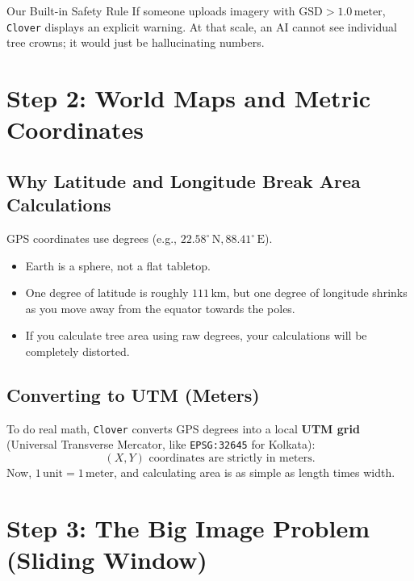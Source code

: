\documentclass[11pt,a4paper]{article}
\begin{document}
\begin{plainbox}{Our Built-in Safety Rule}
If someone uploads imagery with $\text{GSD} > 1.0\,\text{meter}$, \texttt{Clover} displays an explicit warning. At that scale, an AI cannot see individual tree crowns; it would just be hallucinating numbers.
\end{plainbox}

\section{Step 2: World Maps and Metric Coordinates}

\subsection{Why Latitude and Longitude Break Area Calculations}
GPS coordinates use degrees (e.g., $22.58^\circ\,\text{N}, 88.41^\circ\,\text{E}$). 
\begin{itemize}
    \item Earth is a sphere, not a flat tabletop. 
    \item One degree of latitude is roughly $111\,\text{km}$, but one degree of longitude shrinks as you move away from the equator towards the poles.
    \item If you calculate tree area using raw degrees, your calculations will be completely distorted.
\end{itemize}

\subsection{Converting to UTM (Meters)}
To do real math, \texttt{Clover} converts GPS degrees into a local \textbf{UTM grid} (Universal Transverse Mercator, like \texttt{EPSG:32645} for Kolkata):
\begin{equation}
(X, Y) \text{ coordinates are strictly in meters.}
\end{equation}
Now, $1\,\text{unit} = 1\,\text{meter}$, and calculating area is as simple as length times width.

\section{Step 3: The Big Image Problem (Sliding Window)}
\end{document}
